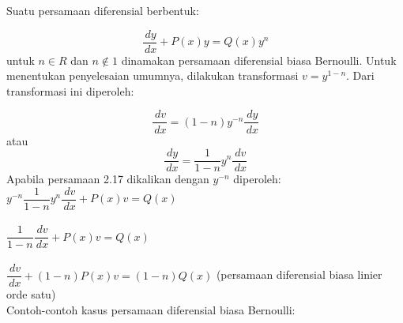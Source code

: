 Suatu persamaan diferensial berbentuk:

\begin{equation} \dfrac{\, dy}{\, dx} + P(x)y = Q(x)y^{n}  \end{equation} untuk \begin{math} n \in R \end{math} dan \begin{math} n \notin 1 \end{math} dinamakan persamaan diferensial biasa Bernoulli. Untuk menentukan penyelesaian umumnya, dilakukan transformasi
\begin{math} v = y^{1 - n} \end{math}. Dari transformasi ini diperoleh:

\begin{displaymath} \dfrac{\, dv}{\, dx} = (1 - n)y^{-n}\dfrac{\, dy}{\, dx} \end{displaymath} atau \begin{displaymath} \dfrac{\, dy}{\, dx} = \dfrac{1}{1 - n}y^{n}\dfrac{\, dv}{\, dx} \end{displaymath}Apabila persamaan 2.17 dikalikan dengan \begin{math} y^{-n} \end{math} diperoleh: \\
\begin{math} y^{-n} \dfrac{1}{1 - n}y^{n} \dfrac{\, dv}{\, dx} + P(x)v = Q(x) \end{math} \\ \\
\begin{math} \dfrac{1}{1 - n} \dfrac{\, dv}{\, dx} + P(x)v = Q(x) \end{math} \\ \\
\begin{math} \dfrac{\, dv}{\, dx} + (1 - n)P(x)v = (1 - n)Q(x) \end{math} (persamaan diferensial biasa linier orde satu) \\ 

Contoh-contoh kasus persamaan diferensial biasa Bernoulli:

